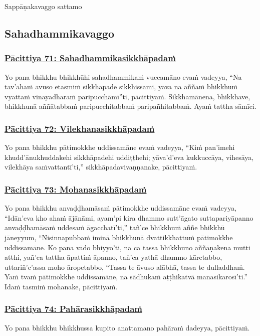\begin{center}
  Sappāṇakavaggo sattamo
\end{center}

\subsection{Sahadhammikavaggo}
\vspace{0.2cm}

\subsubsection*{\hyperref[exp71]{Pācittiya 71: Sahadhammikasikkhāpadaṁ}}
\label{pac71}
Yo pana bhikkhu bhikkhūhi sahadhammikaṁ vuccamāno evaṁ vadeyya, ``Na tāv'āhaṁ āvuso etasmiṁ sikkhāpade sikkhissāmi, yāva na aññaṁ bhikkhuṁ vyattaṁ vinayadharaṁ paripucchāmī''ti, pācittiyaṁ. Sikkhamānena, bhikkhave, bhikkhunā aññātabbaṁ paripucchitabbaṁ paripañhitabbaṁ. Ayaṁ tattha sāmīci.

\subsubsection*{\hyperref[exp72]{Pācittiya 72: Vilekhanasikkhāpadaṁ}}
\label{pac72}
Yo pana bhikkhu pātimokkhe uddissamāne evaṁ vadeyya, ``Kiṁ pan'imehi khudd'ānukhuddakehi sikkhāpadehi uddiṭṭhehi; yāva'd'eva kukkuccāya, vihesāya, vilekhāya saṁvattantī'ti,'' sikkhāpadavivaṇṇanake, pācittiyaṁ.

\subsubsection*{\hyperref[exp73]{Pācittiya 73: Mohanasikkhāpadaṁ}}
\label{pac73}
Yo pana bhikkhu anvaḍḍhamāsaṁ pātimokkhe uddissamāne evaṁ vadeyya, ``Idān'eva kho ahaṁ ājānāmi, ayam'pi kira dhammo sutt'āgato suttapariyāpanno anvaḍḍhamāsaṁ uddesaṁ āgacchatī'ti,'' tañ'ce bhikkhuṁ aññe bhikkhū jāneyyum, ``Nisinnapubbaṁ iminā bhikkhunā dvattikkhattuṁ pātimokkhe uddissamāne. Ko pana vādo bhiyyo'ti, na ca tassa bhikkhuno aññāṇakena mutti atthi, yañ'ca tattha āpattiṁ āpanno, tañ'ca yathā dhammo kāretabbo, uttariñ'c'assa moho āropetabbo, ``Tassa te āvuso alābhā, tassa te dulladdhaṁ. Yaṁ tvaṁ pātimokkhe uddissamāne, na sādhukaṁ aṭṭhikatvā manasikarosī'ti.'' Idaṁ tasmiṁ mohanake, pācittiyaṁ.

\subsubsection*{\hyperref[exp74]{Pācittiya 74: Pahārasikkhāpadaṁ}}
\label{pac74}
Yo pana bhikkhu bhikkhussa kupito anattamano pahāraṁ dadeyya, pācittiyaṁ.

